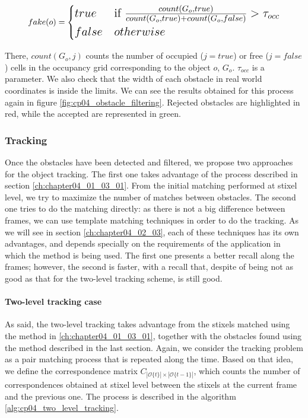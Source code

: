 \begin{equation}\label{eq:cp04_fake_obstacles}
\Large
  fake(o) = 
  \begin{align*}
    \begin{cases}
      true & \text{if } {{count(G_o, true)} \over {count(G_o, true) + count(G_o, false)}} > \tau_{occ} \\
      false & otherwise
    \end{cases}
  \end{align*}
\end{equation}

There, $count(G_o, j)$ counts the number of occupied ($j=true$) or free ($j=false$) cells in the occupancy grid corresponding to the object $o$, $G_o$. $\tau_{occ}$ is a parameter. We also check that the width of each obstacle in real world coordinates is inside the limits. We can see the results obtained for this process again in figure \ref{fig:cp04_obstacle_filtering}. Rejected obstacles are highlighted in red, while the accepted are represented in green.

\subsubsection{Tracking}\label{ch:chapter04_01_04_02}

Once the obstacles have been detected and filtered, we propose two approaches for the object tracking. The first one takes advantage of the process described in section \ref{ch:chapter04_01_03_01}. From the initial matching performed at stixel level, we try to maximize the number of matches between obstacles. The second one tries to do the matching directly: as there is not a big difference between frames, we can use template matching techniques in order to do the tracking. As we will see in section \ref{ch:chapter04_02_03}, each of these techniques has its own advantages, and depends specially on the requirements of the application in which the method is being used. The first one presents a better recall along the frames; however, the second is faster, with a recall that, despite of being not as good as that for the two-level tracking scheme, is still good.

\paragraph{Two-level tracking case}\label{ch:chapter04_01_04_02_01}

As said, the two-level tracking takes advantage from the stixels matched using the method in \ref{ch:chapter04_01_03_01}, together with the obstacles found using the method described in the last section. Again, we consider the tracking problem as a pair matching process that is repeated along the time. Based on that idea, we define the correspondence matrix $C_{|\mathcal{O}\{t\}| \times |\mathcal{O}\{t - 1\}|}$, which counts the number of correspondences obtained at stixel level between the stixels at the current frame and the previous one. The process is described in the algorithm \ref{alg:cp04_two_level_tracking}.

